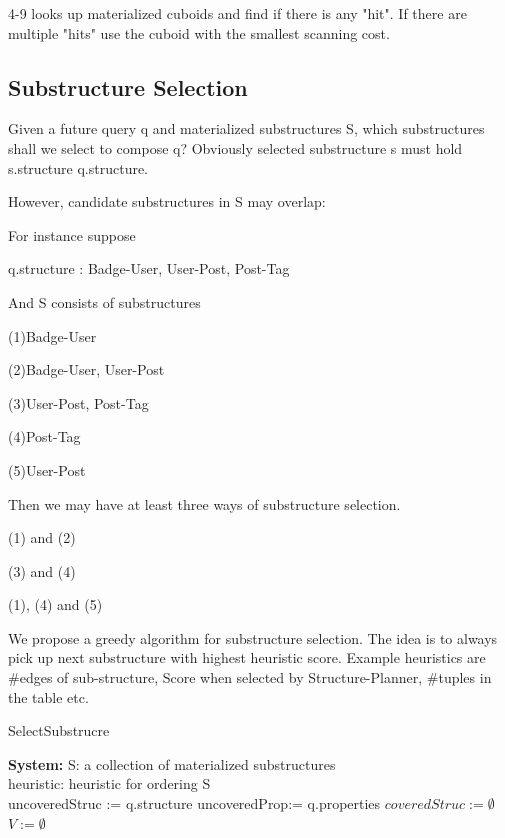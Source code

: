 4-9 looks up materialized cuboids and find if there is any "hit". If there are multiple "hits" use the cuboid with the smallest scanning cost.






\subsection{Substructure Selection}

Given a future query q and materialized substructures S, which substructures shall we select to compose q? Obviously selected substructure s must hold s.structure \subseteq q.structure.
 
However, candidate substructures in S may overlap:

For instance suppose

q.structure : Badge-User, User-Post, Post-Tag

And S consists of substructures 

(1)Badge-User

(2)Badge-User, User-Post 

(3)User-Post, Post-Tag

(4)Post-Tag

(5)User-Post

Then we may have at least three ways of substructure selection.

(1) and (2)

(3) and (4)

(1), (4) and (5)

We propose a greedy algorithm for substructure selection. The idea is to always pick up next substructure with highest heuristic score. Example heuristics are #edges of sub-structure, Score when selected by Structure-Planner, #tuples in the table etc. 

\begin{algorithm}[H]
	\caption{SelectSubstrucre}
	\LinesNumbered
	\textbf{System:} S: a collection of materialized substructures\\ heuristic: heuristic for ordering S\\
	uncoveredStruc := q.structure \;
	uncoveredProp:= q.properties \; 
	$coveredStruc:= \emptyset$ \;
	$V:=\emptyset $\;
\end{algorithm}
\clearpage

